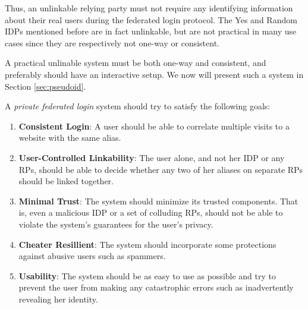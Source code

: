 \documentclass{llncs}
\begin{document}
Thus, an unlinkable relying party must not require any identifying
information about their real users during the federated login
protocol. The Yes and Random IDPs mentioned before are in fact
unlinkable, but are not practical in many use cases since they are
respectively not one-way or consistent.

A practical unlinable system must be both one-way and consistent, and
preferably should have an interactive setup. We now will present such
a system in Section \ref{sec:pseudoid}.



A \emph{private federated login} system should try to satisfy the following
goals:

\begin{enumerate}
  \item \textbf{Consistent Login}: A user should be able to correlate multiple
  visits to a website with the same alias.
  \item \textbf{User-Controlled Linkability}: The user alone, and not her IDP or
  any RPs, should be able to decide whether any two of her aliases on separate
  RPs should be linked together.
  \item \textbf{Minimal Trust}: The system should minimize its trusted
  components. That is, even a malicious IDP or a set of colluding RPs, should
  not be able to violate the system's guarantees for the user's privacy.
  \item \textbf{Cheater Resillient}: The system should incorporate some
  protections against abusive users such as spammers.
  \item \textbf{Usability}: The system should be as easy to use as possible and
  try to prevent the user from making any catastrophic errors such as
  inadvertently revealing her identity.
\end{enumerate}
\end{document}
